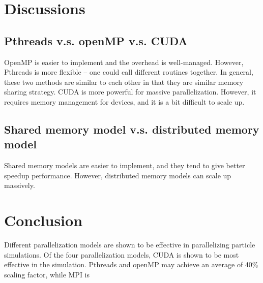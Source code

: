 \documentclass[11pt]{article}
\begin{document}
\section{Discussions}
\subsection{Pthreads v.s. openMP v.s. CUDA}
OpenMP is easier to implement and the overhead is well-managed. However, Pthreads is more flexible -- one could call
different routines together. In general, these two methods are similar to each other in that they are similar memory
sharing strategy. CUDA is more powerful for massive parallelization. However, it requires memory management for devices,
and it is a bit difficult to scale up.

\subsection{Shared memory model v.s. distributed memory model}
Shared memory models are easier to implement, and they tend to give better speedup performance. However, distributed memory 
models can scale up massively.

\section{Conclusion}
Different parallelization models are shown to be effective in parallelizing particle simulations. Of the four parallelization models,
CUDA is shown to be most effective in the simulation. Pthreads and openMP may achieve an average of 40\% scaling factor, while
MPI is 



\end{document}
